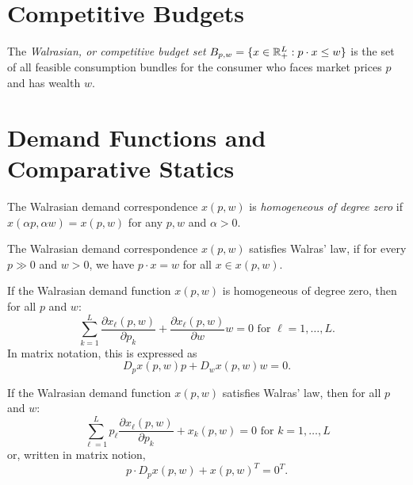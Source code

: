 \addtocounter{section}{3}

\section{Competitive Budgets}

\begin{defn}
    The \emph{Walrasian, or competitive budget set} $B_{p, w} = \{x \in \mathbb{R}^L_+ : p \cdot x \leq w\}$ is the set of all feasible consumption bundles for the consumer who faces market prices $p$ and has wealth $w$.
\end{defn}


\section{Demand Functions and Comparative Statics}

\begin{defn}
    The Walrasian demand correspondence $x(p, w)$ is \emph{homogeneous of degree zero} if $x(\alpha p, \alpha w) = x(p, w)$ for any $p, w$ and $\alpha > 0$.
\end{defn}

\begin{defn}
    The Walrasian demand correspondence $x(p, w)$ satisfies Walras' law, if for every $p \gg 0$ and $w > 0$, we have $p \cdot x = w$ for all $x \in x(p, w)$.
\end{defn}

\begin{prop}
    If the Walrasian demand function $x(p, w)$ is homogeneous of degree zero, then for all $p$ and $w$:
    \begin{equation*}
        \sum_{k = 1}^L \frac{\partial x_\ell(p, w)}{\partial p_k} + \frac{\partial x_{\ell}(p, w)}{\partial w}w = 0 \text{ for } \ell = 1, \dots, L.
    \end{equation*}
    In matrix notation, this is expressed as
    \begin{equation*}
        D_p x(p, w) p + D_w x(p, w) w = 0.
    \end{equation*}
\end{prop}

\begin{prop}
    If the Walrasian demand function $x(p, w)$ satisfies Walras' law, then for all $p$ and $w$:
    \begin{equation*}
        \sum_{\ell = 1}^L p_\ell \frac{\partial x_\ell (p, w)}{\partial p_k} + x_k(p, w) = 0 \text{ for } k = 1, \dots, L
    \end{equation*}
    or, written in matrix notion,
    \begin{equation*}
        p \cdot D_p x(p, w) + x(p, w)^T = 0^T.
    \end{equation*}
\end{prop}

